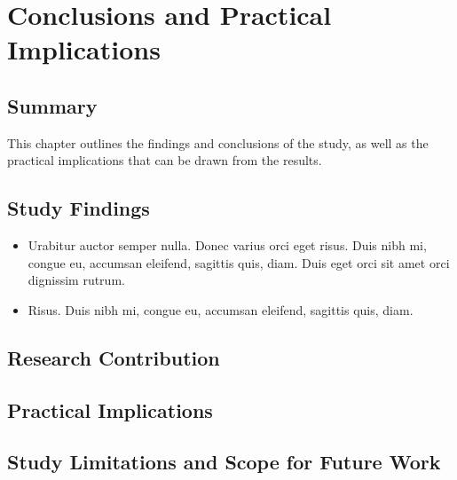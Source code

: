 
\chapter{Conclusions and Practical Implications}\doublespacing %

\label{Chapter6} %




\section{Summary}

This chapter outlines the findings and conclusions of the study, as well as the practical implications that can be drawn from the results.




\section{Study Findings}
\lipsum[1]

\begin{itemize}
    \item Urabitur auctor semper nulla. Donec varius orci eget risus. Duis nibh mi, congue eu, accumsan eleifend, sagittis quis, diam. Duis eget orci sit amet orci dignissim rutrum.

    \item Risus. Duis nibh mi, congue eu, accumsan eleifend, sagittis quis, diam.
\end{itemize}


\section{Research Contribution}
\lipsum[1]


\section{Practical Implications}
\lipsum[3]


\section{Study Limitations and Scope for Future Work}
\lipsum[3]



